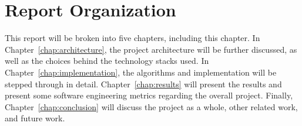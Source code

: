 \section{Report Organization}
\label{sect:report-organization}
This report will be broken into five chapters, including this chapter.  In
Chapter~\ref{chap:architecture}, the project architecture will be further
discussed, as well as the choices behind the technology stacks used.  In
Chapter~\ref{chap:implementation}, the algorithms and implementation will be
stepped through in detail.  Chapter~\ref{chap:results} will present the results
and present some software engineering metrics regarding the overall project.
Finally, Chapter~\ref{chap:conclusion} will discuss the project as a whole,
other related work, and future work.
